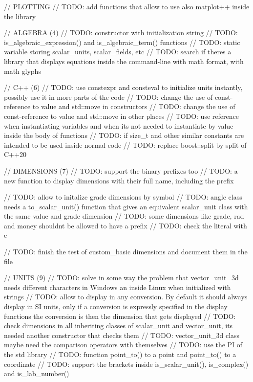 // PLOTTING // TODO\+: add functions that allow to use also matplot++ inside the library

// ALGEBRA (4) // TODO\+: constructor with initialization string // TODO\+: is\+\_\+algebraic\+\_\+expression() and is\+\_\+algebraic\+\_\+term() functions // TODO\+: static variable storing scalar\+\_\+units, scalar\+\_\+fields, etc // TODO\+: search if there\textquotesingle{}s a library that displays equations inside the command-\/line with math format, with math glyphs

// C++ (6) // TODO\+: use constexpr and consteval to initialize units instantly, possibly use it in more parts of the code // TODO\+: change the use of const-\/reference to value and std\+::move in constructors // TODO\+: change the use of const-\/reference to value and std\+::move in other places // TODO\+: use reference when instantiating variables and when it\textquotesingle{}s not needed to instantiate by value inside the body of functions // TODO\+: if size\+\_\+t and other similar constants are intended to be used inside normal code // TODO\+: replace boost\+::split by split of C++20

// DIMENSIONS (7) // TODO\+: support the binary prefixes too // TODO\+: a new function to display dimensions with their full name, including the prefix

// TODO\+: allow to initalize grade dimensions by symbol // TODO\+: angle class needs a to\+\_\+scalar\+\_\+unit() function that gives an equivalent scalar\+\_\+unit class with the same value and grade dimension // TODO\+: some dimensions like grade, rad and money shouldn\textquotesingle{}t be allowed to have a prefix // TODO\+: check the literal with e

// TODO\+: finish the test of custom\+\_\+basic dimensions and document them in the  file

// UNITS (9) // TODO\+: solve in some way the problem that vector\+\_\+unit\+\_\+3d needs different characters in Windows an inside Linux when initialized with strings // TODO\+: allow to display in any conversion. By default it should always display in SI units, only if a conversion is expressly specified in the display functions the conversion is then the dimension that gets displayed // TODO\+: check dimensions in all inheriting classes of scalar\+\_\+unit and vector\+\_\+unit, it\textquotesingle{}s needed another constructor that checks them // TODO\+: vector\+\_\+unit\+\_\+3d class maybe need the comparison operators with themselves // TODO\+: use the PI of the std library // TODO\+: function point\+\_\+to() to a point and point\+\_\+to() to a coordinate // TODO\+: support the brackets inside is\+\_\+scalar\+\_\+unit(), is\+\_\+complex() and is\+\_\+lab\+\_\+number()


